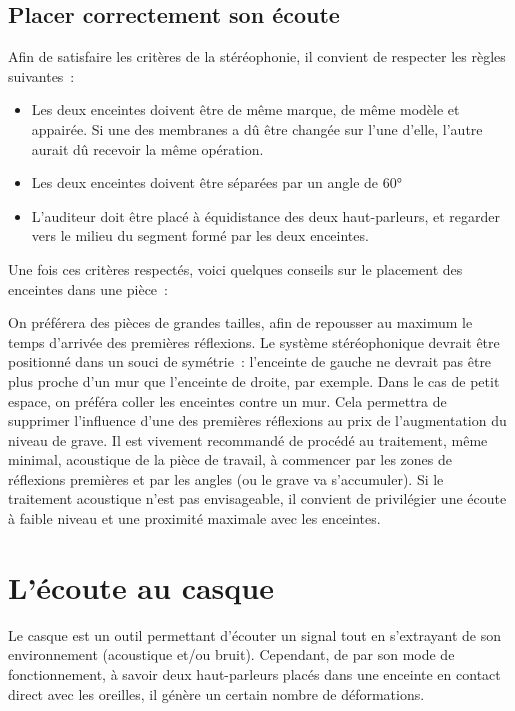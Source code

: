 \documentclass[
]{book}
\providecommand{\tightlist}{%
  \setlength{\itemsep}{0pt}\setlength{\parskip}{0pt}}
\begin{document}
\hypertarget{placer-correctement-son-uxe9coute}{%
\subsection{Placer correctement son écoute}\label{placer-correctement-son-uxe9coute}}

Afin de satisfaire les critères de la stéréophonie, il convient de respecter les règles suivantes~:

\begin{itemize}
\tightlist
\item
  Les deux enceintes doivent être de même marque, de même modèle et appairée. Si une des membranes a dû être changée sur l'une d'elle, l'autre aurait dû recevoir la même opération.
\item
  Les deux enceintes doivent être séparées par un angle de 60°
\item
  L'auditeur doit être placé à équidistance des deux haut-parleurs, et regarder vers le milieu du segment formé par les deux enceintes.
\end{itemize}

Une fois ces critères respectés, voici quelques conseils sur le placement des enceintes dans une pièce~:

On préférera des pièces de grandes tailles, afin de repousser au maximum le temps d'arrivée des premières réflexions. Le système stéréophonique devrait être positionné dans un souci de symétrie~: l'enceinte de gauche ne devrait pas être plus proche d'un mur que l'enceinte de droite, par exemple. Dans le cas de petit espace, on préféra coller les enceintes contre un mur. Cela permettra de supprimer l'influence d'une des premières réflexions au prix de l'augmentation du niveau de grave. Il est vivement recommandé de procédé au traitement, même minimal, acoustique de la pièce de travail, à commencer par les zones de réflexions premières et par les angles (ou le grave va s'accumuler). Si le traitement acoustique n'est pas envisageable, il convient de privilégier une écoute à faible niveau et une proximité maximale avec les enceintes.

\hypertarget{luxe9coute-au-casque}{%
\section{L'écoute au casque}\label{luxe9coute-au-casque}}

Le casque est un outil permettant d'écouter un signal tout en s'extrayant de son environnement (acoustique et/ou bruit). Cependant, de par son mode de fonctionnement, à savoir deux haut-parleurs placés dans une enceinte en contact direct avec les oreilles, il génère un certain nombre de déformations.
\end{document}
